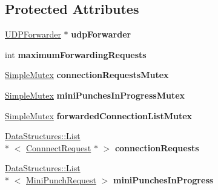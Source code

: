 \subsection*{Protected Attributes}
\begin{DoxyCompactItemize}
\item 
\hypertarget{class_rak_net_1_1_router2_a5445c1ba97de8bc9839b72bec41d7269}{\hyperlink{class_rak_net_1_1_u_d_p_forwarder}{U\-D\-P\-Forwarder} $\ast$ {\bfseries udp\-Forwarder}}\label{class_rak_net_1_1_router2_a5445c1ba97de8bc9839b72bec41d7269}

\item 
\hypertarget{class_rak_net_1_1_router2_ac24f3a9adce18558aa066d50063b1b66}{int {\bfseries maximum\-Forwarding\-Requests}}\label{class_rak_net_1_1_router2_ac24f3a9adce18558aa066d50063b1b66}

\item 
\hypertarget{class_rak_net_1_1_router2_a5bf52f1b925d85ab244cd591bbee61ea}{\hyperlink{class_rak_net_1_1_simple_mutex}{Simple\-Mutex} {\bfseries connection\-Requests\-Mutex}}\label{class_rak_net_1_1_router2_a5bf52f1b925d85ab244cd591bbee61ea}

\item 
\hypertarget{class_rak_net_1_1_router2_a1474d01dcf128e68d10871eebf1f7019}{\hyperlink{class_rak_net_1_1_simple_mutex}{Simple\-Mutex} {\bfseries mini\-Punches\-In\-Progress\-Mutex}}\label{class_rak_net_1_1_router2_a1474d01dcf128e68d10871eebf1f7019}

\item 
\hypertarget{class_rak_net_1_1_router2_a9701c72f70f28c33a27223d46416d99a}{\hyperlink{class_rak_net_1_1_simple_mutex}{Simple\-Mutex} {\bfseries forwarded\-Connection\-List\-Mutex}}\label{class_rak_net_1_1_router2_a9701c72f70f28c33a27223d46416d99a}

\item 
\hypertarget{class_rak_net_1_1_router2_ac0004a5d9109c5ee678da1b0a5e868e4}{\hyperlink{class_data_structures_1_1_list}{Data\-Structures\-::\-List}\\*
$<$ \hyperlink{struct_rak_net_1_1_router2_1_1_connnect_request}{Connnect\-Request} $\ast$ $>$ {\bfseries connection\-Requests}}\label{class_rak_net_1_1_router2_ac0004a5d9109c5ee678da1b0a5e868e4}

\item 
\hypertarget{class_rak_net_1_1_router2_ad05ecc890128830c7c4e1ed6430edd9b}{\hyperlink{class_data_structures_1_1_list}{Data\-Structures\-::\-List}\\*
$<$ \hyperlink{struct_rak_net_1_1_router2_1_1_mini_punch_request}{Mini\-Punch\-Request} $>$ {\bfseries mini\-Punches\-In\-Progress}}\label{class_rak_net_1_1_router2_ad05ecc890128830c7c4e1ed6430edd9b}


\end{DoxyCompactItemize}
